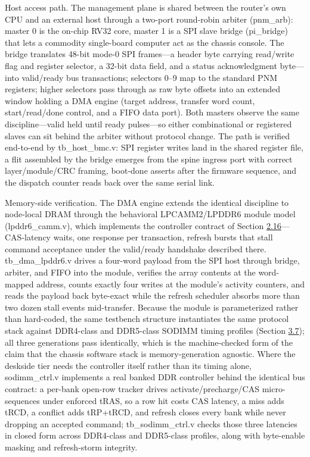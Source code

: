 \documentclass[12pt,onecolumn]{article}
\begin{document}
Host access path. The management plane is shared between the router's own CPU and an external host through a two-port round-robin arbiter (pnm\_arb): master 0 is the on-chip RV32 core, master 1 is a SPI slave bridge (pi\_bridge) that lets a commodity single-board computer act as the chassis console. The bridge translates 48-bit mode-0 SPI frames---a header byte carrying read/write flag and register selector, a 32-bit data field, and a status acknowledgment byte---into valid/ready bus transactions; selectors 0--9 map to the standard PNM registers; higher selectors pass through as raw byte offsets into an extended window holding a DMA engine (target address, transfer word count, start/read/done control, and a FIFO data port). Both masters observe the same discipline---valid held until ready pulses---so either combinational or registered slaves can sit behind the arbiter without protocol change. The path is verified end-to-end by tb\_host\_bmc.v: SPI register writes land in the shared register file, a flit assembled by the bridge emerges from the spine ingress port with correct layer/module/CRC framing, boot-done asserts after the firmware sequence, and the dispatch counter reads back over the same serial link.

Memory-side verification. The DMA engine extends the identical discipline to node-local DRAM through the behavioral LPCAMM2/LPDDR6 module model (lpddr6\_camm.v), which implements the controller contract of Section \hyperref[sec:2.16]{2.16}---CAS-latency waits, one response per transaction, refresh bursts that stall command acceptance under the valid/ready handshake described there. tb\_dma\_lpddr6.v drives a four-word payload from the SPI host through bridge, arbiter, and FIFO into the module, verifies the array contents at the word-mapped address, counts exactly four writes at the module's activity counters, and reads the payload back byte-exact while the refresh scheduler absorbs more than two dozen stall events mid-transfer. Because the module is parameterized rather than hard-coded, the same testbench structure instantiates the same protocol stack against DDR4-class and DDR5-class SODIMM timing profiles (Section \hyperref[sec:3.7]{3.7}); all three generations pass identically, which is the machine-checked form of the claim that the chassis software stack is memory-generation agnostic. Where the deskside tier needs the controller itself rather than its timing alone, sodimm\_ctrl.v implements a real banked DDR controller behind the identical bus contract: a per-bank open-row tracker drives activate/precharge/CAS micro-sequences under enforced tRAS, so a row hit costs CAS latency, a miss adds tRCD, a conflict adds tRP+tRCD, and refresh closes every bank while never dropping an accepted command; tb\_sodimm\_ctrl.v checks those three latencies in closed form across DDR4-class and DDR5-class profiles, along with byte-enable masking and refresh-storm integrity.
\end{document}
